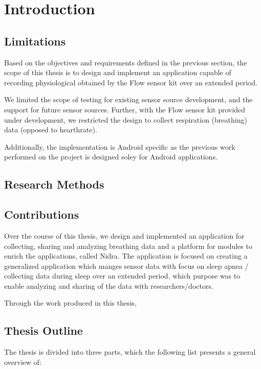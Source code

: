 \chapter{Introduction}\label{introduction}




\section{Limitations}
Based on the objectives and requirements defined in the previous section, the scope of this thesis is to design and implement an application capable of recording physiological obtained by the Flow sensor kit over an extended period. 

We limited the scope of testing for existing sensor source development, and the support for future sensor sources. Further, with the Flow sensor kit provided under development, we restricted the design to collect respiration (breathing) data (opposed to hearthrate).

Additionally, the implementation is Android specific as the previous work performed on the project is designed soley for Android applications. 

\section{Research Methods}

\section{Contributions}
Over the course of this thesis, we design and implemented an application for collecting, sharing and analyzing breathing data and a platform for modules to enrich the applications, called Nidra. The application is focused on creating a generalized application which manges sensor data with focus on sleep apnea / collecting data during sleep over an extended period, which purpose was to enable analyzing and sharing of the data with researchers/doctors.  

Through the work produced in this thesis, 


\section{Thesis Outline}
The thesis is divided into three parts, which the following list presents a general overview of:

